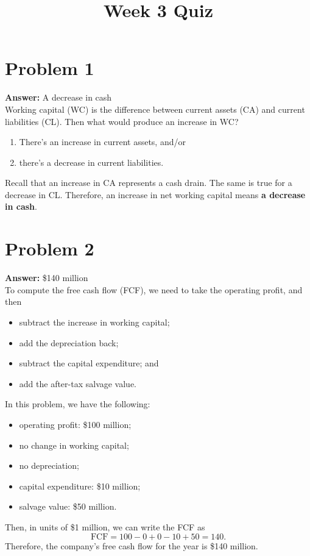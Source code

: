 \documentclass[11pt]{article}
\date{}
\title{Week 3 Quiz}
\begin{document}
\thispagestyle{empty}
\pagestyle{empty}
\section*{Problem 1}
\label{sec:org1b516ae}

\textbf{Answer:} A decrease in cash\\

Working capital (WC) is the difference between current assets (CA) and current
liabilities (CL). Then what would produce an increase in WC?
\begin{enumerate}
\item There's an increase in current assets, and/or
\item there's a decrease in current liabilities.
\end{enumerate}
Recall that an increase in CA represents a cash drain. The same is true for a
decrease in CL. Therefore, an increase in net working capital means \textbf{a decrease
in cash}.
\section*{Problem 2}
\label{sec:org747124e}

\textbf{Answer:} \$140 million\\

To compute the free cash flow (FCF), we need to take the operating profit, and
then
\begin{itemize}
\item subtract the increase in working capital;
\item add the depreciation back;
\item subtract the capital expenditure; and
\item add the after-tax salvage value.
\end{itemize}
In this problem, we have the following:
\begin{itemize}
\item operating profit: \$100 million;
\item no change in working capital;
\item no depreciation;
\item capital expenditure: \$10 million;
\item salvage value: \$50 million.
\end{itemize}
Then, in units of \$1 million, we can write the FCF as
\begin{equation}
\mathrm{FCF}=100-0+0-10+50=140.
\end{equation}
Therefore, the company's free cash flow for the year is \$140 million.
\end{document}
